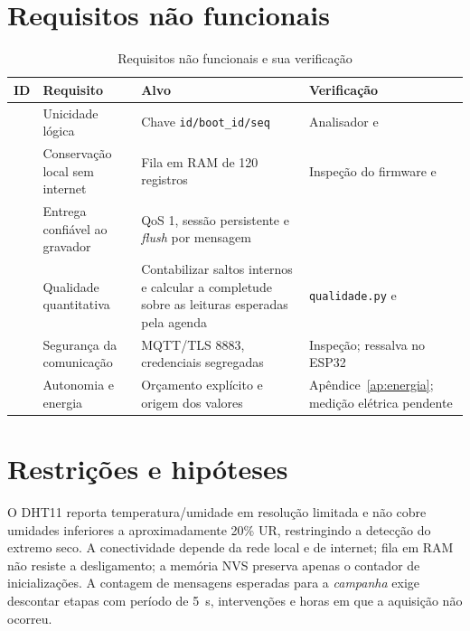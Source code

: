 \section{Requisitos não funcionais}
\begin{table}[H]\centering\caption{Requisitos não funcionais e sua verificação}\label{tab:rnf}\scriptsize
\begin{tabular}{@{}L{1.2cm}L{5.1cm}L{4cm}L{4.1cm}@{}}\toprule
\textbf{ID}&\textbf{Requisito}&\textbf{Alvo}&\textbf{Verificação}\\\midrule
{}&Unicidade lógica&Chave \texttt{id/boot\_id/seq}&Analisador e \\
&Conservação local sem internet&Fila em RAM de 120 registros&Inspeção do firmware e \\
&Entrega confiável ao gravador&QoS 1, sessão persistente e \emph{flush} por mensagem&\\
&Qualidade quantitativa&Contabilizar saltos internos e calcular a completude sobre as leituras esperadas pela agenda&\texttt{qualidade.py} e \\
&Segurança da comunicação&MQTT/TLS 8883, credenciais segregadas&Inspeção; ressalva no ESP32\\
&Autonomia e energia&Orçamento explícito e origem dos valores&Apêndice~\ref{ap:energia}; medição elétrica pendente\\
\bottomrule\end{tabular}\end{table}
\section{Restrições e hipóteses}
O DHT11 reporta temperatura/umidade em resolução limitada e não cobre umidades inferiores a aproximadamente 20\% UR, restringindo a detecção do extremo seco. A conectividade depende da rede local e de internet; fila em RAM não resiste a desligamento; a memória NVS preserva apenas o contador de inicializações. A contagem de mensagens esperadas para a \emph{campanha} exige descontar etapas com período de 5~s, intervenções e horas em que a aquisição não ocorreu.
